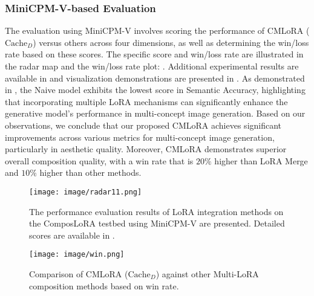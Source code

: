 \subsubsection{MiniCPM-V-based Evaluation}
\label{sec:llmeva}
\vspace{-0pt}
The evaluation using MiniCPM-V involves scoring the performance of CMLoRA ($\text{Cache}_{D}$) versus others across four dimensions, as well as determining the win/loss rate based on these scores. The specific score and win/loss rate are illustrated in the radar map  and the win/loss rate plot: . Additional experimental results are available in  and visualization demonstrations are presented in . As demonstrated in , the Naive model exhibits the lowest score in Semantic Accuracy, highlighting that incorporating multiple LoRA mechanisms can significantly enhance the generative model's performance in multi-concept image generation. Based on our observations, we conclude that our proposed CMLoRA achieves significant improvements across various metrics for multi-concept image generation, particularly in aesthetic quality. Moreover, CMLoRA demonstrates superior overall composition quality, with a win rate that is $20\%$ higher than LoRA Merge and $10\%$ higher than other methods.
\vspace{-6pt}
\begin{figure}[H]
    \centering
    \setlength{\abovecaptionskip}{-1pt}
    \setlength{\belowcaptionskip}{-8pt}
    \begin{minipage}{0.54\textwidth}
        \centering
        \texttt{[image: image/radar11.png]}
        \caption{The performance evaluation results of LoRA integration methods on the ComposLoRA testbed using MiniCPM-V are presented. Detailed scores are available in .}
        \label{fig:radar1}
    \end{minipage}%
    \hfill
    \begin{minipage}{0.44\textwidth}
        \centering
        \texttt{[image: image/win.png]}
        \caption{Comparison of CMLoRA ($\text{Cache}_{D}$) against other Multi-LoRA composition methods based on win rate.}
        \label{fig:win}
    \end{minipage}
\end{figure}
\vspace{-11pt}
